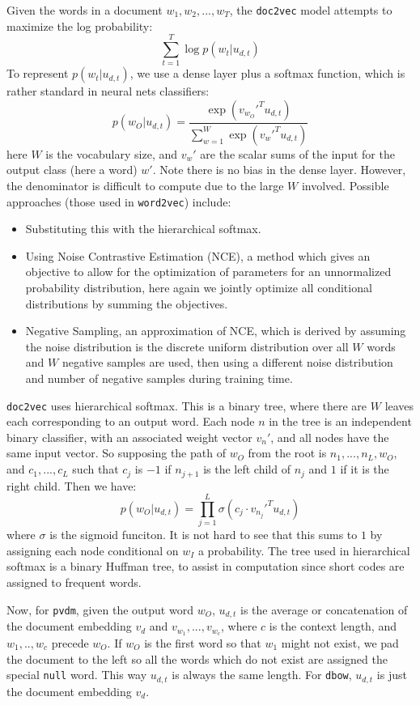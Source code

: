 \documentclass{article}
\begin{document}
Given the words in a document $w_1,w_2,...,w_T$, the \texttt{doc2vec} model attempts to maximize the log probability:
    \[\sum_{t=1}^T \log p(w_t|u_{d,t})\]
To represent $p(w_t|u_{d,t})$, we use a dense layer plus a softmax function, which is rather standard in neural nets classifiers:
    \[p(w_O|u_{d,t})=\frac{\exp(v_{w_O}'^T u_{d,t})}{\sum_{w=1}^W \exp(v_w'^T u_{d,t})}\]
here $W$ is the vocabulary size, and $v_w'$ are the scalar sums of the input for the output class (here a word) $w'$. Note there is no bias in the dense layer. However, the denominator is difficult to compute due to the large $W$ involved. Possible approaches (those used in \texttt{word2vec}) include:
\begin{itemize}
    \item Substituting this with the hierarchical softmax.
    \item Using Noise Contrastive Estimation (NCE), a method which gives an objective to allow for the optimization of parameters for an unnormalized probability distribution, here again we jointly optimize all conditional distributions by summing the objectives.
    \item Negative Sampling, an approximation of NCE, which is derived by assuming the noise distribution is the discrete uniform distribution over all $W$ words and $W$ negative samples are used, then using a different noise distribution and number of negative samples during training time.
\end{itemize}

\texttt{doc2vec} uses hierarchical softmax. This is a binary tree, where there are $W$ leaves each corresponding to an output word. Each node $n$ in the tree is an independent binary classifier, with an associated weight vector $v_n'$, and all nodes have the same input vector. So supposing the path of $w_O$ from the root is $n_1,...,n_L,w_O$, and $c_1,...,c_L$ such that $c_j$ is $-1$ if $n_{j+1}$ is the left child of ${n_j}$ and $1$ if it is the right child. Then we have:
    \[p(w_O|u_{d,t})=\prod_{j=1}^{L}\sigma(c_j\cdot v_{n_j}'^T u_{d,t})\]
where $\sigma$ is the sigmoid funciton. It is not hard to see that this sums to $1$ by assigning each node conditional on $w_I$ a probability. The tree used in hierarchical softmax is a binary Huffman tree, to assist in computation since short codes are assigned to frequent words.

Now, for \texttt{pvdm}, given the output word $w_O$, $u_{d,t}$ is the average or concatenation of the document embedding $v_d$ and $v_{w_1},...,v_{w_c}$, where $c$ is the context length, and $w_1,..,w_c$ precede $w_O$. If $w_O$ is the first word so that $w_1$ might not exist, we pad the document to the left so all the words which do not exist are assigned the special \texttt{null} word. This way $u_{d,t}$ is always the same length. For \texttt{dbow}, $u_{d,t}$ is just the document embedding $v_d$.
\end{document}
